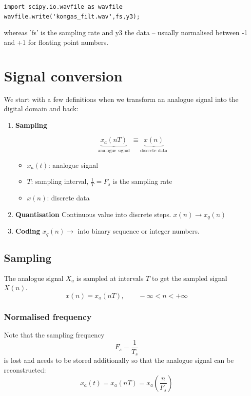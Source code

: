 \documentclass[12pt,a4paper]{article}
\begin{document}
\begin{verbatim}
import scipy.io.wavfile as wavfile
wavfile.write('kongas_filt.wav',fs,y3);
\end{verbatim}
whereas 'fs' is the sampling rate and y3 the data -- usually normalised between
-1 and +1 for floating point numbers.


\clearpage


\section{Signal conversion}

We start with a few definitions when we transform an analogue signal into the digital
domain and back:

\begin{enumerate}

\item {\bf Sampling}

\begin{equation}
\underbrace{x_{a}(nT)}_{\mbox{analogue signal}}~ \equiv \underbrace{x(n)}_{\mbox{discrete data}}
\end{equation}

\begin{itemize}
\item $x_a(t)$: analogue signal
\item $T$: sampling interval, $\frac{1}{T}=F_s$ is the sampling rate
\item $x(n)$: discrete data
\end{itemize}

\item {\bf Quantisation} 
Continuous value into discrete steps. $x(n) \rightarrow x_{q}(n)$

\item {\bf Coding}
$x_{q}(n) \rightarrow$  into binary sequence or integer numbers.
\end{enumerate}


\subsection{Sampling}
The analogue signal $X_a$ is sampled at intervals $T$ to get
the sampled signal $X(n)$.
\begin{equation}
x(n) = x_{a}(nT),  \qquad -\infty < n < +\infty
\end{equation}

\subsubsection{Normalised frequency}
Note that the sampling frequency
\begin{equation}
F_{s} = \frac{1}{T_s}
\end{equation}
is lost and needs to be stored additionally so that the analogue
signal can be reconstructed:
\begin{equation}
x_{a}(t) = x_{a}(nT) = x_{a}(\frac{n}{F_{s}})
\end{equation}
\end{document}
